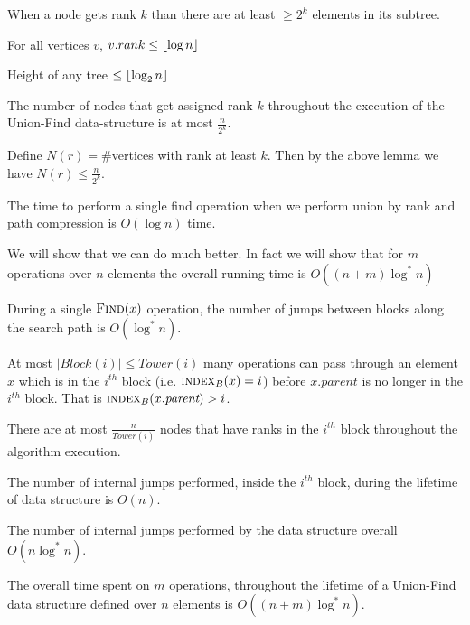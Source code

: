\begin{lemma}{}{}
	When a node gets rank $k$ than there are at least $\geq 2^k$ elements in its subtree.
\end{lemma}
\begin{corolary}{}{}
	For all vertices $v$, $v.rank\leq \left\lfloor \log n\right\rfloor$
\end{corolary}
\begin{corolary}{}{}
	Height of any tree $\leq \left\lfloor\log _2n\right\rfloor$
\end{corolary}
\begin{lemma}{}{}
	The number of nodes that get assigned rank $k$ throughout the execution of the Union-Find data-structure is at most $\frac{n}{2^k}$.
\end{lemma}
Define $N(r)=\#$vertices with rank at least $k$. Then by the above lemma we have $N(r)\leq \frac{n}{2^k}$.
\begin{lemma}{}{}
	The time to perform a single find operation when we perform union by rank and path
	compression is $O(\log n)$ time.
\end{lemma}
We will show that we can do much better. In fact we will show that for $m$ operations over $n$ elements the overall running time is $O((n+m)\log ^*n)$

\begin{lemma}{}{}
	During a single $\textsc{Find}(x)$ operation, the number of jumps between blocks along the search path is $O(\log^*n)$.
\end{lemma}
\begin{lemma}{}{}
	At most $|\textit{Block}(i)|\leq \textit{Tower}(i)$ many  operations can pass through an element $x$ which is in the $i^{th}$ block (i.e. $\textsc{index}_B(x)=i$) before $x.\textit{parent}$ is no longer in the $i^{th}$ block. That is $\textsc{index}_B(x.\textit{parent})>i$.
\end{lemma}

\begin{lemma}{}{}
	There are at most $\frac{n}{\textit{Tower}(i)}$ nodes that have ranks in the $i^{th}$ block throughout the algorithm execution.
\end{lemma}

\begin{lemma}{}{}
	The number of internal jumps performed, inside the $i^{th}$ block, during the lifetime of  data structure is $O(n)$.
\end{lemma}

\begin{Theorem}{}{}
	The number of internal jumps performed by the  data structure overall $O(n\log^*n)$.
\end{Theorem}
\begin{Theorem}{}{}
	The overall time spent on $m$  operations, throughout the lifetime of a Union-Find data structure defined over $n$ elements is $O((n+m)\log^*n)$.
\end{Theorem}